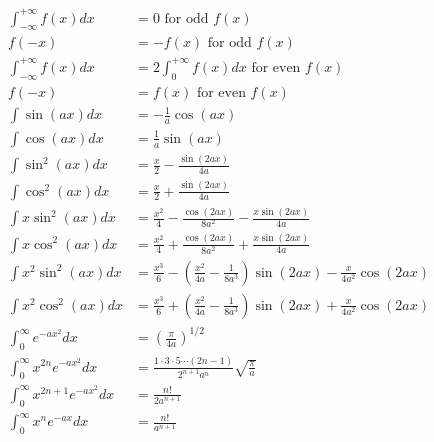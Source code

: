 \begin{align*}
\int_{-\infty}^{+\infty} f\left(x\right) dx &= 0 \textrm{ for odd } f\left(x\right)\\
f\left(-x\right) &= -f\left(x\right)\textrm{ for odd } f\left(x\right)\\
\int_{-\infty}^{+\infty} f\left(x\right) dx &= 2 \int_{0}^{+\infty} f\left(x\right) dx \textrm{ for even } f\left(x\right)\\
f\left(-x\right) &= f\left(x\right)\textrm{ for even } f\left(x\right)\\
\int \sin \left(ax\right) dx &= -\frac{1}{a} \cos \left(ax\right)\\
\int \cos \left(ax\right) dx &= \frac{1}{a} \sin \left(ax\right)\\
\int \sin^2 \left(ax\right) dx &= \frac{x}{2} - \frac{\sin \left(2ax\right)} {4a} \\
\int \cos^2 \left(ax\right) dx &= \frac{x}{2} + \frac{\sin \left(2ax\right)} {4a} \\
\int x \sin^2 \left(ax \right) dx &= \frac{x^2}{4} - \frac{\cos \left(2ax\right)}{8a^2} - \frac{x \sin \left(2ax\right)}{4a}\\
\int x \cos^2 \left(ax \right) dx &= \frac{x^2}{4} + \frac{\cos \left(2ax\right)}{8a^2} + \frac{x \sin \left(2ax\right)}{4a}\\
\int x^2 \sin^2 \left(ax \right) dx &= \frac{x^3}{6} - \left(\frac{x^2}{4a}-\frac{1}{8a^3}\right)\sin\left(2ax \right) -\frac{x}{4a^2}\cos\left(2ax\right)\\
\int x^2 \cos^2 \left(ax \right) dx &= \frac{x^3}{6} + \left(\frac{x^2}{4a}-\frac{1}{8a^3}\right)\sin\left(2ax \right) +\frac{x}{4a^2}\cos\left(2ax\right)\\
\int_0^{\infty} e^{-ax^2}dx &= \left(\frac{\pi}{4a} \right)^{1/2}\\
\int_0^\infty x^{2n}e^{-ax^2}dx&=\frac{1\cdot 3 \cdot 5 \cdots \left(2n-1\right)}{2^{n+1}a^n}\sqrt{\frac{\pi}{a}}\\
\int_0^\infty x^{2n+1}e^{-ax^2}dx&=\frac{n!}{2a^{n+1}}\\
\int_0^\infty x^{n}e^{-ax}dx&=\frac{n!}{a^{n+1}}\\
\end{align*}
